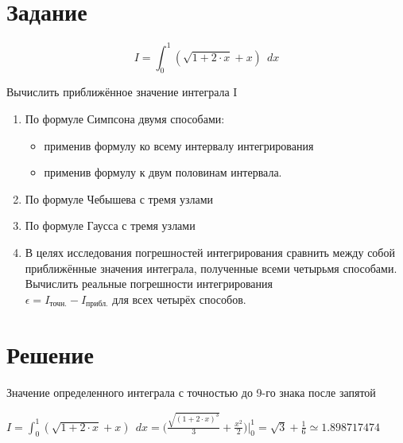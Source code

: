 





\section{Задание}

\begin{displaymath}
I = \int_{0}^{1} (\sqrt{1 + 2 \cdot x} + x)\ \ dx
\end{displaymath}

Вычислить приближённое значение интеграла I

\begin{enumerate}

\item По формуле Симпсона двумя способами:

\begin{itemize}

\item применив формулу ко всему интервалу интегрирования

\item применив формулу к двум половинам интервала.

\end{itemize}

\item По формуле Чебышева с тремя узлами

\item По формуле Гаусса с тремя узлами

\item В целях исследования погрешностей интегрирования сравнить между собой приближённые значения интеграла, полученные всеми четырьмя способами. Вычислить реальные погрешности интегрирования \\ $\epsilon = I_\text{точн.} - I_\text{прибл.}$ для всех четырёх способов.

\end{enumerate}

\section{Решение}

Значение определенного интеграла с точностью до 9-го знака после запятой

$I = \int_{0}^{1} (\sqrt{1 + 2 \cdot x} + x)\ \ dx = \Big ( \frac{\sqrt{(1 + 2 \cdot x)^3}}{3} + \frac{x^2}{2} \Big ) \Big |_0^1 = \sqrt{3} + \frac{1}{6} \simeq 1.898717474$

